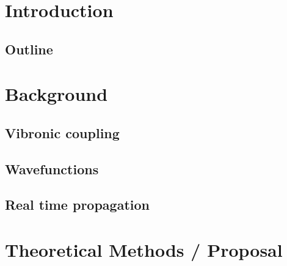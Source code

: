 \documentclass[11pt, letterpaper, oneside]{article}  %
\begin{document}
\pagestyle{plain}
\setcounter{page}{1} %
\tableofcontents
\newpage

\listoffigures
\newpage

\listoftables
\newpage


\setcounter{page}{1} %
\section{Introduction}
\lipsum[39]
\subsection{Outline}
\lipsum[41-42]
\newpage%

\section{Background}
\subsection{Vibronic coupling}
\lipsum[53-57]
\subsection{Wavefunctions}
\lipsum[58-62]
\subsection{Real time propagation}
\lipsum[62-65]
\newpage%

\section{Theoretical Methods / Proposal}
\end{document}
